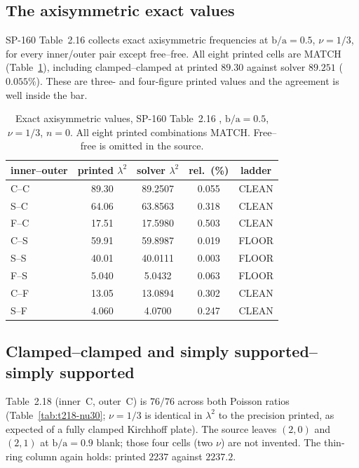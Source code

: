 \documentclass[11pt]{article}
\newcommand{\lamsq}{\lambda^{2}}
\newcommand{\ba}{\mbox{b/a}}
\begin{document}
\subsection{The axisymmetric exact values}\label{sec:t216}
SP-160 Table~2.16 collects exact axisymmetric frequencies at $\ba=0.5$,
$\nu=1/3$, for every inner/outer pair except free--free. All eight printed
cells are MATCH (Table~\ref{tab:t216}), including clamped--clamped at
printed $89.30$ against solver $89.251$ ($0.055\%$). These are three- and
four-figure printed values and the agreement is well inside the bar.

\begin{table}[htbp]\centering\small
\caption{Exact axisymmetric values, SP-160 Table~2.16
\cite{leissaSP160}, $\ba=0.5$, $\nu=1/3$, $n=0$. All eight printed
combinations MATCH. Free--free is omitted in the source.}
\label{tab:t216}
\begin{tabular}{lcccc}
\toprule
inner--outer & printed $\lamsq$ & solver $\lamsq$ & rel.\ (\%) & ladder\\
\midrule
C--C & 89.30 & 89.2507 & 0.055 & CLEAN \\
S--C & 64.06 & 63.8563 & 0.318 & CLEAN \\
F--C & 17.51 & 17.5980 & 0.503 & CLEAN \\
C--S & 59.91 & 59.8987 & 0.019 & FLOOR \\
S--S & 40.01 & 40.0111 & 0.003 & FLOOR \\
F--S & 5.040 & 5.0432 & 0.063 & FLOOR \\
C--F & 13.05 & 13.0894 & 0.302 & CLEAN \\
S--F & 4.060 & 4.0700 & 0.247 & CLEAN \\
\bottomrule
\end{tabular}
\end{table}

\subsection{Clamped--clamped and simply supported--simply supported}
\label{sec:t218}
Table~2.18 (inner~C, outer~C) is $76/76$ across both Poisson ratios
(Table~\ref{tab:t218-nu30}; $\nu=1/3$ is identical in $\lamsq$ to the
precision printed, as expected of a fully clamped Kirchhoff plate). The
source leaves $(2,0)$ and $(2,1)$ at $\ba=0.9$ blank; those four cells
(two $\nu$) are not invented. The thin-ring column again holds: printed
$2237$ against $2237.2$.
\end{document}
